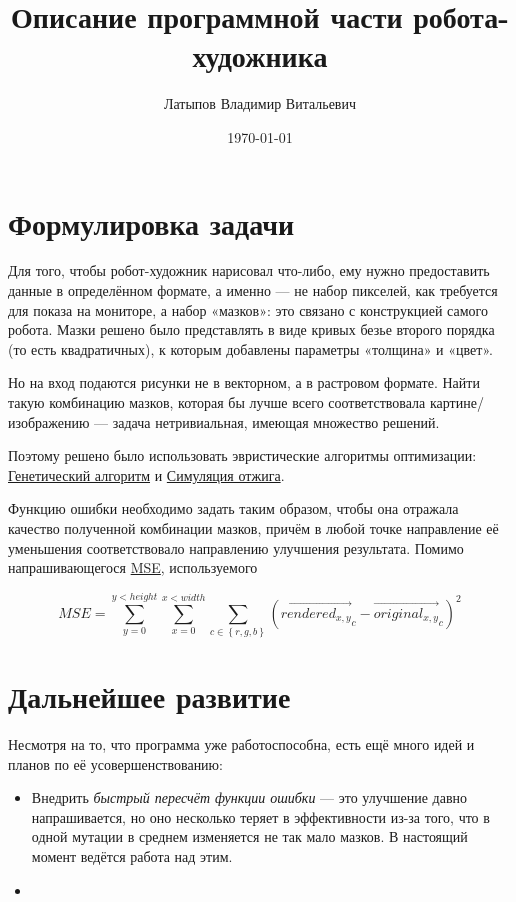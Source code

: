 \documentclass[11pt]{article}
\title{Описание программной части робота-художника}
\author{Латыпов Владимир Витальевич}
\date{\today}
\begin{document}
    \maketitle



    \section{Формулировка задачи}

    Для того, чтобы робот-художник нарисовал что-либо, ему нужно предоставить данные в определённом формате, а именно — не набор пикселей,
    как требуется для показа на мониторе, а набор «мазков»: это связано с конструкцией самого робота.
    Мазки решено было представлять в виде кривых безье второго порядка (то есть квадратичных), к которым добавлены параметры «толщина» и «цвет».

    Но на вход подаются рисунки не в векторном, а в растровом формате.
    Найти такую комбинацию мазков, которая бы лучше всего соответствовала картине/изображению — задача нетривиальная, имеющая множество решений.

    Поэтому решено было использовать эвристические алгоритмы оптимизации:
    \href{https://en.wikipedia.org/wiki/Simulated_annealing}{Генетический алгоритм} и \href{https://en.wikipedia.org/wiki/Simulated_annealing}{Симуляция отжига}.

    Функцию ошибки необходимо задать таким образом, чтобы она отражала качество полученной комбинации мазков,
    причём в любой точке направление её уменьшения соответствовало направлению улучшения результата.
    Помимо напрашивающегося \href{https://en.wikipedia.org/wiki/Mean_squared_error}{MSE}, используемого

    \begin{equation}\label{eq:equation}
        MSE = \sum_{y = 0}^{y < height} { \sum_{x = 0}^{x < width} { \sum_{c \in  \left\{ r, g, b \right\} } { \left( {\overrightarrow {rendered_{x, y}}}_c - {\overrightarrow{original_{x, y}}}_c\right)^2 }}}
    \end{equation}


    \section{Дальнейшее развитие}
    Несмотря на то, что программа уже работоспособна, есть ещё много идей и планов по её усовершенствованию:
    \begin{itemize}
        \item Внедрить \textit{быстрый пересчёт функции ошибки} — это улучшение давно напрашивается,
                но оно несколько теряет в эффективности из-за того, что в одной мутации в среднем изменяется не так мало мазков. В настоящий момент ведётся работа над этим.
        \item
    \end{itemize}
\end{document}
